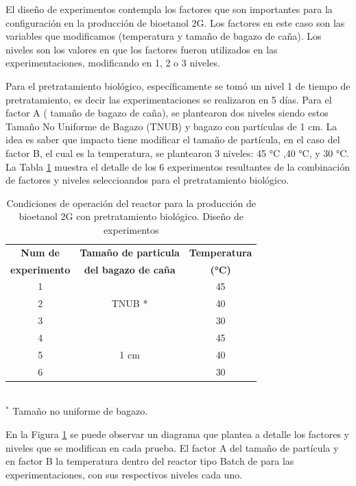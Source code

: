 \documentclass[12pt]{article}
\begin{document}
			
	El diseño de experimentos contempla los factores que son importantes para la configuración en la producción de bioetanol 2G. Los factores en este caso son las variables que modificamos (temperatura y tamaño de bagazo de caña).	Los niveles son los valores en que los factores fueron utilizados en las experimentaciones, modificando en 1, 2 o 3 niveles.
	
	Para el pretratamiento biológico, específicamente se tomó un nivel 1 de tiempo de pretratamiento, es decir las experimentaciones se realizaron en 5 días. Para el factor A ( tamaño de bagazo de caña), se plantearon dos niveles siendo estos Tamaño No Uniforme de Bagazo (TNUB) y bagazo con partículas de 1 cm. La idea es saber que impacto tiene modificar el tamaño de partícula, en el caso del factor B, el cual es la temperatura, se plantearon 3 niveles: 45 °C ,40 °C, y 30 °C. La Tabla \ref{biologico2} muestra el detalle de los 6 experimentos resultantes de la combinación de factores y niveles seleccioandos para el pretratamiento biológico.
	

		
	
\begin{table}[H]
	\centering
	\caption{Condiciones de operación del reactor para la producción de bioetanol 2G con pretratamiento biológico. Diseño de experimentos}
	\label{biologico2}
		\begin{tabular}{|c|c|c|  }
			\hline
			\textbf{Num de} & \textbf{Tamaño de particula } & \textbf{Temperatura} \\
		\textbf{experimento} 	& \textbf{ del bagazo de caña} &  \textbf{(°C)}   \\		
			\hline
			1   & \multirow{3}{*}{TNUB *} & 45  \\	\cline{1-1}	
			2 &  & 40 \\ \cline{1-1} 						
			3 &  & 30 \\ \cline{1-3}			
			4 &\multirow{3}{*}{1 cm} & 45    \\\cline{1-1}			
			5 &  & 40   \\  \cline{1-1}				
			6 &  & 30     \\  \cline{1-1}		
			\hline
		\end{tabular}
	\\[3pt] %
	\footnotesize{$^{*}$  Tamaño no uniforme de bagazo.}
	
\end{table}


En la Figura \ref{biologico2} se puede observar un diagrama que plantea a detalle los factores y niveles que se modifican en cada prueba. El factor A del tamaño de partícula y en factor B la temperatura dentro del reactor tipo Batch de para las experimentaciones, con sus respectivos niveles cada uno.
\end{document}
